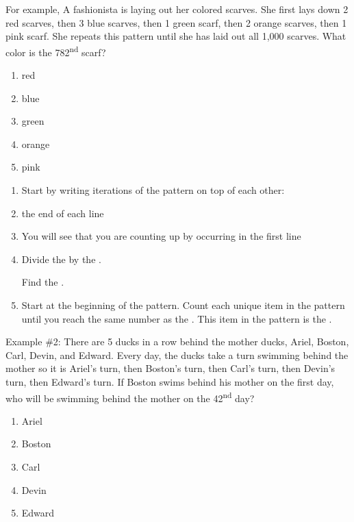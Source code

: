 \documentclass[12pt]{book}
\newcommand{\longline}{\underline{\hspace{2in}} }
\begin{document}
\bigskip
For example, A fashionista is laying out her colored scarves. She first lays down 2 red scarves, then 3 blue scarves, then 1 green scarf, then 2 orange scarves, then 1 pink scarf. She repeats this pattern until she has laid out all 1,000 scarves. What color is the 782\textsuperscript{nd} scarf?

\begin{enumerate}[label=(\Alph*)]
\item red
\item blue
\item green
\item orange
\item pink
\end{enumerate}

\begin{enumerate}
\item Start by writing \longline iterations of the pattern on top of each other:
\vfill\item \longline the end of each line
\vfill\item You will see that you are counting up by \longline occurring in the first line
\vfill\item Divide the \longline by the \longline.

Find the \longline.
\vfill\item Start at the beginning of the pattern. Count each unique item in the pattern until you reach the same number as the \longline. This item in the pattern is the \longline.
\end{enumerate}

Example \#2: There are 5 ducks in a row behind the mother ducks, Ariel, Boston, Carl, Devin, and Edward. Every day, the ducks take a turn swimming behind the mother so it is Ariel's turn, then Boston's turn, then Carl's turn, then Devin's turn, then Edward's turn. If Boston swims behind his mother on the first day, who will be swimming behind the mother on the 42\textsuperscript{nd} day?

\begin{enumerate}[label=(\Alph*)]
\item Ariel
\item Boston
\item Carl
\item Devin
\item Edward
\end{enumerate}
\end{document}
